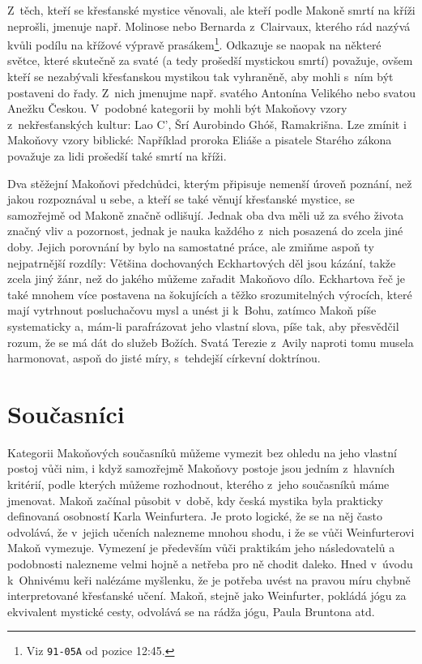 Z~těch, kteří se křesťanské mystice věnovali, ale kteří podle Makoně smrtí na
kříži neprošli, jmenuje např. Molinose nebo Bernarda z~Clairvaux, kterého rád
nazývá kvůli podílu na křížové výpravě prasákem\footnote{Viz \texttt{91-05A} od
pozice 12:45.}. Odkazuje se naopak na některé
světce, které skutečně za svaté (a tedy prošedší mystickou smrtí) považuje, ovšem
kteří se nezabývali křesťanskou mystikou tak vyhraněně, aby mohli s~ním být
postaveni do řady. Z~nich jmenujme např. svatého Antonína Velikého nebo svatou
Anežku Českou. V~podobné kategorii by mohli být Makoňovy vzory z~nekřesťanských
kultur: Lao C', Šrí Aurobindo Ghóš, Ramakrišna. Lze zmínit i Makoňovy vzory
biblické: Například proroka Eliáše a pisatele Starého zákona považuje za lidi
prošedší také smrtí na kříži.

Dva stěžejní Makoňovi předchůdci, kterým připisuje nemenší úroveň poznání, než jakou
rozpoznával u sebe, a kteří se také věnují křesťanské mystice, se samozřejmě od
Makoně značně odlišují. Jednak oba dva měli už za svého života značný vliv a
pozornost, jednak je nauka každého z~nich posazená do zcela jiné doby. Jejich
porovnání by bylo na samostatné práce, ale zmiňme aspoň ty nejpatrnější rozdíly:
Většina dochovaných Eckhartových děl jsou kázání, takže zcela jiný žánr, než do
jakého můžeme zařadit Makoňovo dílo. Eckhartova řeč je také mnohem více
postavena na šokujících a těžko srozumitelných výrocích, které mají vytrhnout
posluchačovu mysl a unést ji k~Bohu, zatímco Makoň píše systematicky a, mám-li
parafrázovat jeho vlastní slova, píše tak, aby přesvědčil rozum, že se má dát do služeb
Božích. Svatá Terezie z~Avily naproti tomu musela harmonovat, aspoň do jisté
míry, s~tehdejší církevní doktrínou.

\section{Současníci}

Kategorii Makoňových současníků můžeme vymezit bez ohledu na jeho vlastní postoj
vůči nim, i když samozřejmě Makoňovy postoje jsou jedním z~hlavních kritérií,
podle kterých můžeme rozhodnout, kterého z~jeho současníků máme jmenovat. Makoň
začínal působit v~době, kdy česká mystika byla prakticky definovaná osobností
Karla Weinfurtera\cite{sanitrak2006dejiny1}. Je proto logické, že se na něj
často odvolává, že v~jejich učeních nalezneme mnohou shodu, i že se vůči
Weinfurterovi Makoň vymezuje. Vymezení je především vůči praktikám jeho
následovatelů a podobnosti nalezneme velmi hojně a netřeba pro ně chodit
daleko. Hned v~úvodu k~Ohnivému keři\cite{weinfurter1923ohnivy} nalézáme
myšlenku, že je potřeba uvést na pravou míru chybně interpretované křesťanské
učení. Makoň, stejně jako Weinfurter, pokládá jógu za ekvivalent mystické cesty,
odvolává se na rádža jógu, Paula Bruntona atd.


